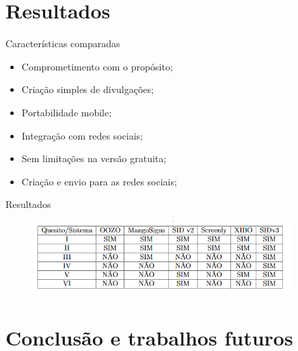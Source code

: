 \documentclass{aula-ifb}
\begin{document}
\section{Resultados}
\begin{frame}{Características comparadas}
	\begin{itemize}
		\item Comprometimento com o propósito;
		\vspace{10px}
		\item Criação simples de divulgações;
		\vspace{10px}
		\item Portabilidade mobile;
		\vspace{10px}
		\item Integração com redes sociais;
		\vspace{10px}
		\item Sem limitações na versão gratuita;
		\vspace{10px}
		\item Criação e envio para as redes sociais;
	\end{itemize}
\end{frame}

\begin{frame}{Resultados}
\begin{figure}[h]
\includegraphics[width=10cm]{figuras/tabela.png}
\label{fig:figuramobile3}
\end{figure}
\end{frame}

\section{Conclusão e trabalhos futuros}
\begin{frame}

\end{frame}
\end{document}
